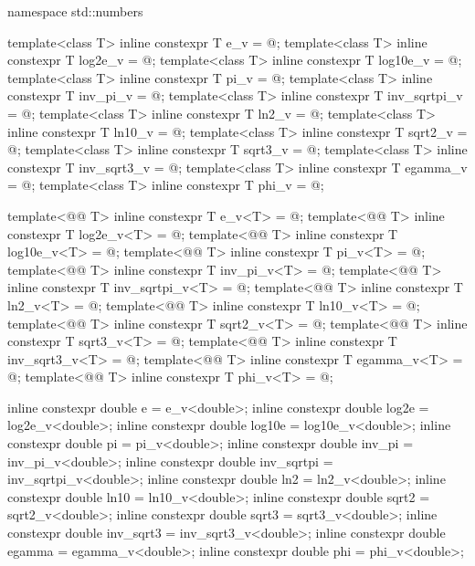 %
\begin{codeblock}
namespace std::numbers {
  template<class T> inline constexpr T e_v          = @\unspec@;
  template<class T> inline constexpr T log2e_v      = @\unspec@;
  template<class T> inline constexpr T log10e_v     = @\unspec@;
  template<class T> inline constexpr T pi_v         = @\unspec@;
  template<class T> inline constexpr T inv_pi_v     = @\unspec@;
  template<class T> inline constexpr T inv_sqrtpi_v = @\unspec@;
  template<class T> inline constexpr T ln2_v        = @\unspec@;
  template<class T> inline constexpr T ln10_v       = @\unspec@;
  template<class T> inline constexpr T sqrt2_v      = @\unspec@;
  template<class T> inline constexpr T sqrt3_v      = @\unspec@;
  template<class T> inline constexpr T inv_sqrt3_v  = @\unspec@;
  template<class T> inline constexpr T egamma_v     = @\unspec@;
  template<class T> inline constexpr T phi_v        = @\unspec@;

  template<@@ T> inline constexpr T e_v<T>          = @\seebelow@;
  template<@@ T> inline constexpr T log2e_v<T>      = @\seebelow@;
  template<@@ T> inline constexpr T log10e_v<T>     = @\seebelow@;
  template<@@ T> inline constexpr T pi_v<T>         = @\seebelow@;
  template<@@ T> inline constexpr T inv_pi_v<T>     = @\seebelow@;
  template<@@ T> inline constexpr T inv_sqrtpi_v<T> = @\seebelow@;
  template<@@ T> inline constexpr T ln2_v<T>        = @\seebelow@;
  template<@@ T> inline constexpr T ln10_v<T>       = @\seebelow@;
  template<@@ T> inline constexpr T sqrt2_v<T>      = @\seebelow@;
  template<@@ T> inline constexpr T sqrt3_v<T>      = @\seebelow@;
  template<@@ T> inline constexpr T inv_sqrt3_v<T>  = @\seebelow@;
  template<@@ T> inline constexpr T egamma_v<T>     = @\seebelow@;
  template<@@ T> inline constexpr T phi_v<T>        = @\seebelow@;

  inline constexpr double e          = e_v<double>;
  inline constexpr double log2e      = log2e_v<double>;
  inline constexpr double log10e     = log10e_v<double>;
  inline constexpr double pi         = pi_v<double>;
  inline constexpr double inv_pi     = inv_pi_v<double>;
  inline constexpr double inv_sqrtpi = inv_sqrtpi_v<double>;
  inline constexpr double ln2        = ln2_v<double>;
  inline constexpr double ln10       = ln10_v<double>;
  inline constexpr double sqrt2      = sqrt2_v<double>;
  inline constexpr double sqrt3      = sqrt3_v<double>;
  inline constexpr double inv_sqrt3  = inv_sqrt3_v<double>;
  inline constexpr double egamma     = egamma_v<double>;
  inline constexpr double phi        = phi_v<double>;
}
\end{codeblock}


